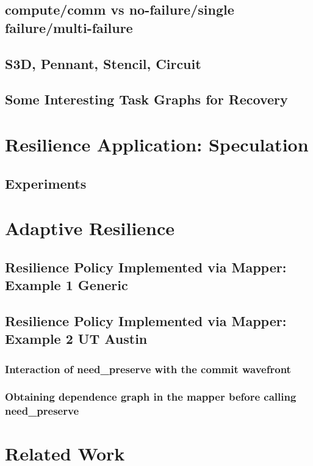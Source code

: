 \documentclass{llncs}
\begin{document}
\subsection{compute/comm vs no-failure/single failure/multi-failure}

\subsection{S3D, Pennant, Stencil, Circuit}

\subsection{Some Interesting Task Graphs for Recovery}

\section{Resilience Application: Speculation}

\subsection{Experiments}

\section{Adaptive Resilience}

\subsection{Resilience Policy Implemented via Mapper: Example 1 Generic}

\subsection{Resilience Policy Implemented via Mapper: Example 2 UT Austin}
\subsubsection{Interaction of need\_preserve with the commit wavefront}
\subsubsection{Obtaining dependence graph in the mapper before calling need\_preserve} 

\section{Related Work}
\end{document}

